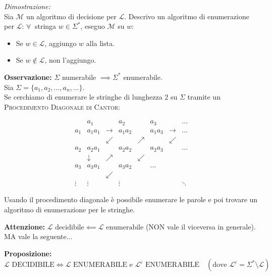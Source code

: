 \textit{Dimostrazione:} \\
Sia $\mathcal{M}$ un algoritmo di decisione per $\mathcal{L}$. Descrivo un algoritmo di enumerazione per $\mathcal{L}$:
$\forall\ $ stringa $w \in \Sigma^*$, eseguo $\mathcal{M}$ su $w$:
\begin{itemize}
    \item Se $w \in \mathcal{L}$, aggiungo $w$ alla lista.
    \item Se $w \notin \mathcal{L}$, non l'aggiungo.
\end{itemize}

\vspace{0.4cm}
\textbf{Osservazione:} $\Sigma$ numerabile $\implies \Sigma^*$ enumerabile. \\
Sia $\Sigma = \{a_1, a_2, \dots, a_n, \dots\}$. \\
Se cerchiamo di enumerare le stringhe di lunghezza 2 su $\Sigma$ tramite un \textsc{Procedimento Diagonale di Cantor}:

$$\renewcommand{\arraystretch}{1.2}
\begin{array}{c|ccccccc}
 & a_1 & & a_2 & & a_3 & & \dots \\
\hline
a_1 & a_1 a_1 & \rightarrow & a_1 a_2 & & a_1 a_3 & \rightarrow & \dots \\
 & & \swarrow & & \nearrow & & \swarrow & \\
a_2 & a_2 a_1 & & a_2 a_2 & & a_2 a_3 & & \dots \\
 & \downarrow & \nearrow & & \swarrow & & & \\
a_3 & a_3 a_1 & & a_3 a_2 & & \dots & & \\
 & & \swarrow & & & & & \\
\vdots & \vdots & & \vdots & & & & \ddots
\end{array}$$


Usando il procedimento diagonale è possibile enumerare le parole e poi trovare un algoritmo di enumerazione per le stringhe.

\vspace{0.4cm}
\textbf{Attenzione:} $\mathcal{L} \text{ decidibile} \impliedby \mathcal{L} \text{ enumerabile}$ (NON vale il viceversa in generale). \\
MA vale la seguente...

\vspace{0.4cm}
\textbf{Proposizione:} 
$$\mathcal{L} \text{ DECIDIBILE} \iff \mathcal{L} \text{ ENUMERABILE e } \mathcal{L}^c \text{ ENUMERABILE} \quad (\text{dove } \mathcal{L}^c = \Sigma^* \setminus \mathcal{L})$$

